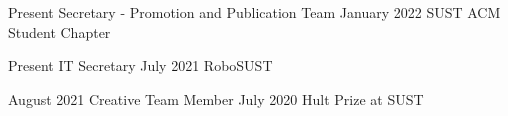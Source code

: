 %
%
%



\begin{scholarship}
   \scholarshipentry
    {Present}   {Secretary - Promotion and Publication Team}{}{}
    {January 2022} {
                       SUST ACM Student Chapter
                    }
                  
  \emptySeparator
  \scholarshipentry
    {Present}   {IT Secretary}{}{}
    {July 2021} {
                       RoboSUST
                }
                  
  \emptySeparator
  \scholarshipentry
    {August 2021}   {Creative Team Member}{}{}
    {July 2020} {
                       Hult Prize at SUST
                }
                  
  \emptySeparator
 

\end{scholarship}
